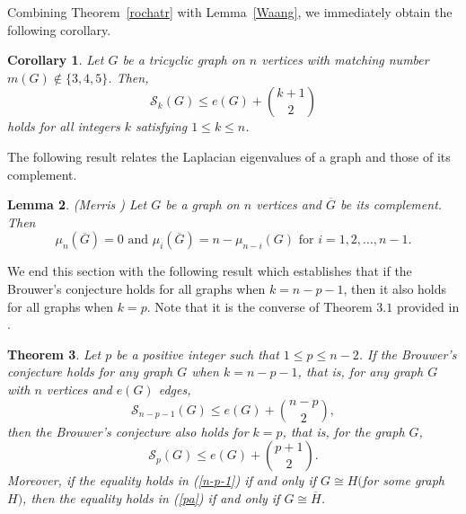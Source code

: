 \documentclass[12pt]{article}
\theoremstyle{plain}
\newtheorem{theorem}{Theorem}[section]
\newtheorem{lemma}[theorem]{Lemma}
\newtheorem{corollary}[theorem]{Corollary}
\theoremstyle{definition}
\begin{document}
Combining Theorem~\ref{rochatr} with Lemma~\ref{Waang}, we immediately obtain the following corollary.

\begin{corollary}
	Let $G$ be a tricyclic graph on $n$ vertices with matching number $m(G)\notin \{3,4,5\}$. Then,
	$$
	\mathcal{S}_k(G)\leq e(G)+\binom{k+1}{2}
	$$
	holds for all integers $k$ satisfying $1\leq k\leq n$.
\end{corollary}
The following result relates the Laplacian eigenvalues of a graph and those of its complement. 
\begin{lemma} \label{lapcom}{\em (Merris \cite{Merris1998})} 
	Let $G$ be a graph on $n$ vertices and $\overline{G}$ be its complement. Then $$\mu_n(\overline{G})=0 \mbox{ and } \mu_i(\overline{G})=n-\mu_{n-i}(G) \mbox{ for }i=1,2,\ldots,n-1.$$
\end{lemma} 
We end this section with the following result which establishes that if the Brouwer’s conjecture holds for all graphs when $k=n-p-1$, then it also holds for all graphs when $k=p$. Note that it is the converse of Theorem $3.1$ provided in \cite{Chen2019}.
\begin{theorem} \label{revchen0} 
	Let $p$ be a positive integer such that $1\leq p\leq n-2$. If the Brouwer's conjecture holds for any graph $G$ when $k=n-p-1$, that is, for any graph $G$ with $n$ vertices and $e(G)$ edges,
	\begin{equation}\label{n-p-1}
		\mathcal{S}_{n-p-1}(G)\leq e(G)+\binom{n-p}{2}, 
	\end{equation}
	then the Brouwer's conjecture also holds for $k=p$, that is, for the  graph $G$,
	\begin{equation}\label{pa}
		\mathcal{S}_{p}(G)\leq e(G)+\binom{p+ 1}{2}.
	\end{equation}
	Moreover, if the equality holds in (\ref{n-p-1}) if and only if $G\cong H$$($for some graph $H)$, then the equality holds in (\ref{pa}) if and only if $G\cong \overline{H}$.	
\end{theorem}
\end{document}
